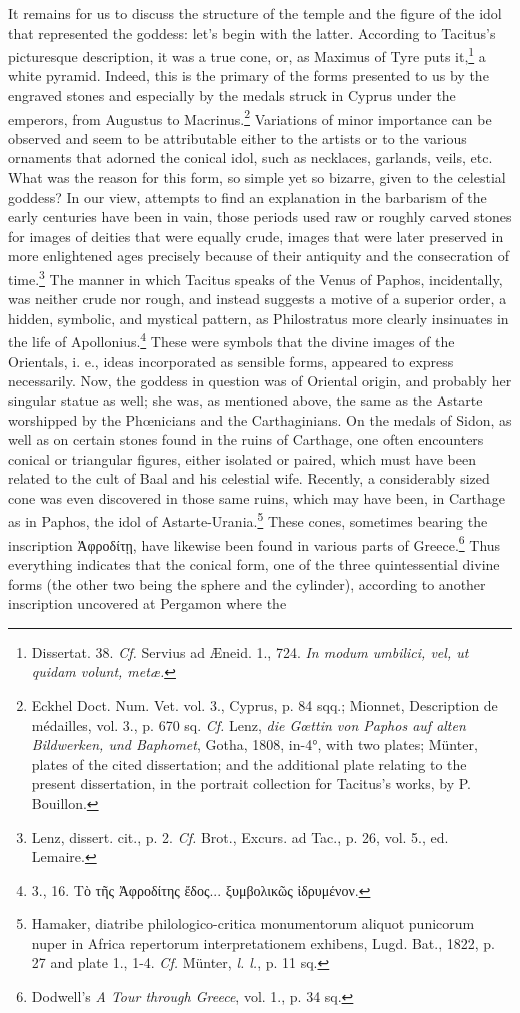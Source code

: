 \documentclass[a4paper, 11pt, oneside, polutonikogreek, english]{article}
\begin{document}
It remains for us to discuss the structure of the temple and the figure of the idol that represented the goddess: let's begin with the latter. According to Tacitus's picturesque description, it was a true cone, or, as Maximus of Tyre puts it,\footnote{Dissertat. 38. \emph{Cf.} Servius ad Æneid. 1., 724. \emph{In modum umbilici, vel, ut quidam volunt, metæ.}} a white pyramid. Indeed, this is the primary of the forms presented to us by the engraved stones and especially by the medals struck in Cyprus under the emperors, from Augustus to Macrinus.\footnote{Eckhel Doct. Num. Vet. vol. 3., Cyprus, p. 84 sqq.; Mionnet, Description de médailles, vol. 3., p. 670 sq. \emph{Cf.} Lenz, \emph{die Gœttin von Paphos auf alten Bildwerken, und Baphomet}, Gotha, 1808, in-4°, with two plates; Münter, plates of the cited dissertation; and the additional plate relating to the present dissertation, in the portrait collection for Tacitus's works, by P. Bouillon.} Variations of minor importance can be observed and seem to be attributable either to the artists or to the various ornaments that adorned the conical idol, such as necklaces, garlands, veils, etc. What was the reason for this form, so simple yet so bizarre, given to the celestial goddess? In our view, attempts to find an explanation in the barbarism of the early centuries have been in vain, those periods used raw or roughly carved stones for images of deities that were equally crude, images that were later preserved in more enlightened ages precisely because of their antiquity and the consecration of time.\footnote{Lenz, dissert. cit., p. 2. \emph{Cf.} Brot., Excurs. ad Tac., p. 26, vol. 5., ed. Lemaire.} The manner in which Tacitus speaks of the Venus of Paphos, incidentally, was neither crude nor rough, and instead suggests a motive of a superior order, a hidden, symbolic, and mystical pattern, as Philostratus more clearly insinuates in the life of Apollonius.\footnote{3., 16. Τὸ τῆς Ἀφροδίτης ἔδος... ξυμβολικῶς ἱδρυμένον.} These were symbols that the divine images of the Orientals, i. e., ideas incorporated as sensible forms, appeared to express necessarily. Now, the goddess in question was of Oriental origin, and probably her singular statue as well; she was, as mentioned above, the same as the Astarte worshipped by the Phœnicians and the Carthaginians. On the medals of Sidon, as well as on certain stones found in the ruins of Carthage, one often encounters conical or triangular figures, either isolated or paired, which must have been related to the cult of Baal and his celestial wife. Recently, a considerably sized cone was even discovered in those same ruins, which may have been, in Carthage as in Paphos, the idol of Astarte-Urania.\footnote{Hamaker, diatribe philologico-critica monumentorum aliquot punicorum nuper in Africa repertorum interpretationem exhibens, Lugd. Bat., 1822, p. 27 and plate 1., 1-4. \emph{Cf.} Münter, \emph{l. l.}, p. 11 sq.} These cones, sometimes bearing the inscription Ἀφροδίτῃ, have likewise been found in various parts of Greece.\footnote{Dodwell's \emph{A Tour through Greece}, vol. 1., p. 34 sq.} Thus everything indicates that the conical form, one of the three quintessential divine forms (the other two being the sphere and the cylinder), according to another inscription uncovered at Pergamon where the 
\end{document}
